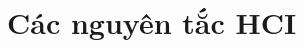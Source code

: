 \documentclass[12pt,a4paper]{article}
\begin{document}



\newpage
\appendix
\appendixpage
\addappheadtotoc
\section{Các nguyên tắc HCI}

\end{document}
